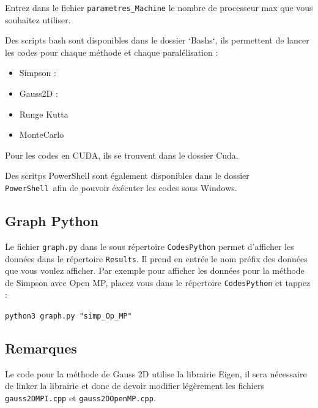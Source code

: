 \documentclass[10pt,a4paper]{article}
\begin{document}
Entrez dans le fichier \verb|parametres_Machine| le nombre de processeur max que vous souhaitez utiliser.

Des scripts bash sont disponibles dans le dossier `Bashs`, ils permettent de lancer les codes pour chaque méthode et chaque paralélisation : 
\begin{itemize}
  \item Simpson : 
  \item Gauss2D :
  \item Runge Kutta 
  \item MonteCarlo 
\end{itemize}

Pour les codes en CUDA, ils se trouvent dans le dossier Cuda.

Des scritps PowerShell sont également disponibles dans le dossier \verb|PowerShell| afin de pouvoir éxécuter les codes sous Windows.

\subsection{Graph Python}

Le fichier \verb|graph.py| dans le sous répertoire \verb|CodesPython| permet d'afficher les données dans le répertoire \verb|Results|. 
Il prend en entrée le nom préfix des données que vous voulez afficher.
Par exemple pour afficher les données pour la méthode de Simpson avec Open MP, placez vous dans le répertoire \verb|CodesPython| et tappez : 
\begin{center}
\verb|python3 graph.py "simp_Op_MP"|
\end{center}

\subsection{Remarques}
Le code pour la méthode de Gauss 2D utilise la librairie Eigen, il sera nécessaire de linker la librairie et donc de devoir modifier légèrement les fichiers \verb|gauss2DMPI.cpp| et \verb|gauss2DOpenMP.cpp|.
\end{document}
